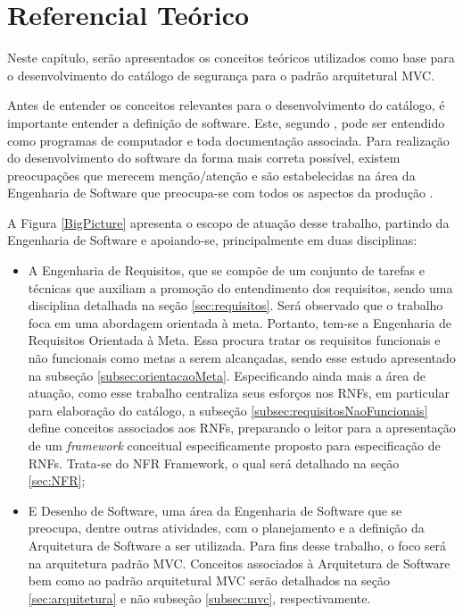 \chapter[Referencial Teórico]{Referencial Teórico}
\label{chap:referencialTeorico}

Neste capítulo, serão apresentados os conceitos teóricos utilizados como base para o desenvolvimento do catálogo de segurança para o padrão arquitetural MVC.

Antes de entender os conceitos relevantes para o desenvolvimento do catálogo, é importante entender a definição de software. Este, segundo \cite{sommerville2003engenharia}, pode ser entendido como programas de computador e toda documentação associada. Para realização do desenvolvimento do software da forma mais correta possível, existem preocupações que merecem menção/atenção e são estabelecidas na área da Engenharia de Software que preocupa-se com todos os aspectos da produção \cite{sommerville2003engenharia}. 

A Figura \ref{BigPicture} apresenta o escopo de atuação desse trabalho, partindo da Engenharia de Software e apoiando-se, principalmente em duas disciplinas: 

\begin{itemize}
	
	\item A Engenharia de Requisitos, que se compõe de um conjunto de tarefas e técnicas que auxiliam a promoção do entendimento dos requisitos, sendo uma disciplina detalhada na seção \ref{sec:requisitos}. Será observado que o trabalho foca em uma abordagem orientada à meta. Portanto, tem-se a Engenharia de Requisitos Orientada à Meta. Essa procura tratar os requisitos funcionais e não funcionais como metas a serem alcançadas, sendo esse estudo apresentado na subseção \ref{subsec:orientacaoMeta}. Especificando ainda mais a área de atuação, como esse trabalho centraliza seus esforços nos RNFs, em particular para elaboração do catálogo, a subseção \ref{subsec:requisitosNaoFuncionais} define conceitos associados aos RNFs, preparando o leitor para a apresentação de um \textit{framework} conceitual especificamente proposto para especificação de RNFs. Trata-se do NFR Framework, o qual será detalhado na seção \ref{sec:NFR};
	
	\item E Desenho de Software, uma área da Engenharia de Software que se preocupa, dentre outras atividades, com o planejamento e a definição da Arquitetura de Software a ser utilizada. Para fins desse trabalho, o foco será na arquitetura padrão MVC. Conceitos associados à Arquitetura de Software bem como ao padrão arquitetural MVC serão detalhados na seção \ref{sec:arquitetura} e não subseção \ref{subsec:mvc}, respectivamente.
	
\end{itemize}

